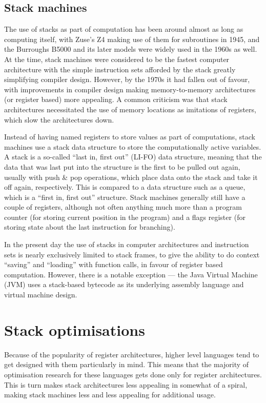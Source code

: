 \subsection{Stack machines}
The use of stacks as part of computation has been around almost as long as
computing itself, with Zuse's Z4 making use of them for subroutines in
1945,\cite{Speiser2000KZZ} and the Burroughs B5000 and its later models were
widely used in the 1960s as well.\cite{Organick2014Computer} At the time, stack
machines were considered to be the fastest computer architecture with the simple
instruction sets afforded by the stack greatly simplifying compiler design.
However, by the 1970s it had fallen out of favour, with improvements in compiler
design making memory-to-memory architectures (or register based) more
appealing. A common criticism was that stack architectures necessitated the use
of memory locations as imitations of registers, which slow the architectures
down.\cite{Myers1977CAS}

Instead of having named registers to store values as part of computations, stack
machines use a stack data structure to store the computationally active
variables. A stack is a so-called ``last in, first out'' (LI-FO) data structure,
meaning that the data that was last put into the structure is the first to be
pulled out again, usually with push \& pop operations, which place data onto the
stack and take it off again, respectively. This is compared to a data structure
such as a queue, which is a ``first in, first out'' structure. Stack machines
generally still have a couple of registers, although not often anything much
more than a program counter (for storing current position in the program) and a
flags register (for storing state about the last instruction for branching).

In the present day the use of stacks in computer architectures and instruction
sets is nearly exclusively limited to stack frames, to give the ability to do
context ``saving'' and ``loading'' with function calls, in favour of register
based computation. However, there is a notable exception --- the Java Virtual
Machine (JVM) uses a stack-based bytecode as its underlying assembly language
and virtual machine design.\cite{Schoeberl2005Design}

\section{Stack optimisations}

Because of the popularity of register architectures, higher level languages tend
to get designed with them particularly in mind. This means that the majority of
optimisation research for these languages gets done only for register
architectures. This is turn makes stack architectures less appealing in somewhat
of a spiral, making stack machines less and less appealing for additional usage.

